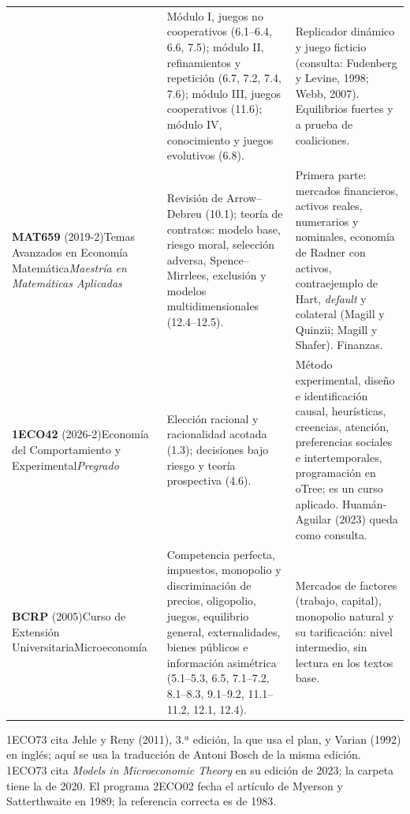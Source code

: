 \documentclass[11pt,a4paper]{article}
\newcommand{\destacado}[1]{{\sffamily\bfseries\color{tonoPrincipal}#1}}
\begin{document}
{\begin{tabularx}{\textwidth}{>{\raggedright\arraybackslash}p{3.1cm}>{\raggedright\arraybackslash}X>{\raggedright\arraybackslash}X}
 & Módulo I, juegos no cooperativos (6.1--6.4, 6.6, 7.5); módulo II, refinamientos y repetición (6.7, 7.2, 7.4, 7.6); módulo III, juegos cooperativos (11.6); módulo IV, conocimiento y juegos evolutivos (6.8).
 & Replicador dinámico y juego ficticio (consulta: Fudenberg y Levine, 1998; Webb, 2007). Equilibrios fuertes y a prueba de coaliciones. \\[3pt]
\textbf{MAT659} (2019-2)\newline Temas Avanzados en Economía Matemática\newline\emph{Maestría en Matemáticas Aplicadas}
 & Revisión de Arrow--Debreu (10.1); teoría de contratos: modelo base, riesgo moral, selección adversa, Spence--Mirrlees, exclusión y modelos multidimensionales (12.4--12.5).
 & Primera parte: mercados financieros, activos reales, numerarios y nominales, economía de Radner con activos, contraejemplo de Hart, \emph{default} y colateral (Magill y Quinzii; Magill y Shafer). Finanzas. \\[3pt]
\textbf{1ECO42} (2026-2)\newline Economía del Comportamiento y Experimental\newline\emph{Pregrado}
 & Elección racional y racionalidad acotada (1.3); decisiones bajo riesgo y teoría prospectiva (4.6).
 & Método experimental, diseño e identificación causal, heurísticas, creencias, atención, preferencias sociales e intertemporales, programación en oTree; es un curso aplicado. Huamán-Aguilar (2023) queda como consulta. \\[3pt]
\textbf{BCRP} (2005)\newline Curso de Extensión Universitaria\newline Microeconomía
 & Competencia perfecta, impuestos, monopolio y discriminación de precios, oligopolio, juegos, equilibrio general, externalidades, bienes públicos e información asimétrica (5.1--5.3, 6.5, 7.1--7.2, 8.1--8.3, 9.1--9.2, 11.1--11.2, 12.1, 12.4).
 & Mercados de factores (trabajo, capital), monopolio natural y su tarificación: nivel intermedio, sin lectura en los textos base. \\
\bottomrule
\end{tabularx}
}

\medskip
\noindent\destacado{Sobre las ediciones.} 1ECO73 cita Jehle y Reny (2011), 3.ª
edición, la que usa el plan, y Varian (1992) en inglés; aquí se usa la
traducción de Antoni Bosch de la misma edición. 1ECO73 cita \emph{Models in
Microeconomic Theory} en su edición de 2023; la carpeta tiene la de 2020.
El programa 2ECO02 fecha el artículo de Myerson y Satterthwaite en 1989; la
referencia correcta es de 1983.
\end{document}

